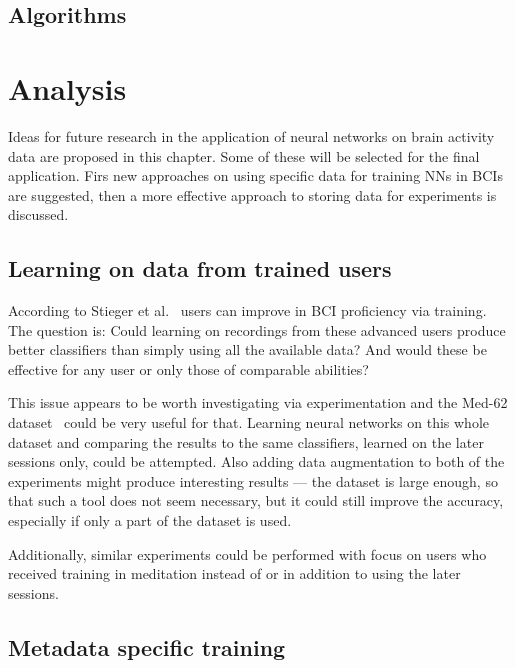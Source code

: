 \documentclass[english, he, bc, kiv, iso690alph]{fasthesis}
\begin{document}
\section{Algorithms}


\chapter{Analysis}

Ideas for future research in the application of neural networks on brain activity data are proposed in this chapter. Some of these will be selected for the final application. Firs new approaches on using specific data for training NNs in BCIs are suggested, then a more effective approach to storing data for experiments is discussed.

\section{Learning on data from trained users}

According to Stieger et al.~\cite{data:stieger:21,stieger:mindfulness:20} users can improve in BCI proficiency via training. The question is: Could learning on recordings from these advanced users produce better classifiers than simply using all the available data? And would these be effective for any user or only those of comparable abilities?

This issue appears to be worth investigating via experimentation and the Med-62 dataset~\cite{data:stieger:21} could be very useful for that. Learning neural networks on this whole dataset and comparing the results to the same classifiers, learned on the later sessions only, could be  attempted. Also adding data augmentation to both of the experiments might produce interesting results --- the dataset is large enough, so that such a tool does not seem necessary, but it could still improve the accuracy, especially if only a part of the dataset is used.

Additionally, similar experiments could be performed with focus on users who received training in meditation instead of or in addition to using the later sessions.

\section{Metadata specific training}
\end{document}
